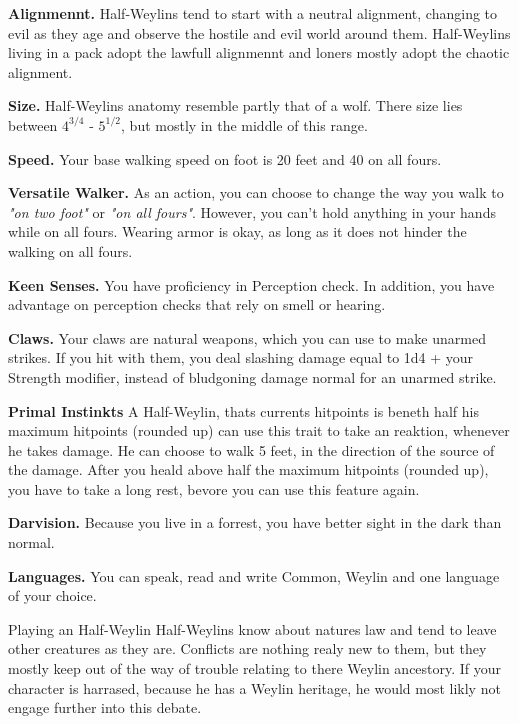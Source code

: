 \textbf{Alignmennt.} Half-Weylins tend to start with a neutral alignment, changing to evil as they age and observe the hostile and evil world around them. Half-Weylins living in a pack adopt the lawfull alignmennt and loners mostly adopt the chaotic alignment.

\textbf{Size.} Half-Weylins anatomy resemble partly that of a wolf. There size lies between $4^{3/4}$ - $5^{1/2}$, but mostly in the middle of this range.

\textbf{Speed.} Your base walking speed on foot is 20 feet and 40 on all fours.

\textbf{Versatile Walker.} As an action, you can choose to change the way you walk to \textit{"on two foot"} or \textit{"on all fours"}. However, you can't hold anything in your hands while on all fours. Wearing armor is okay, as long as it does not hinder the walking on all fours.

\textbf{Keen Senses.} You have proficiency in Perception check. In addition, you have advantage on perception checks that rely on smell or hearing.

\textbf{Claws.} Your claws are natural weapons, which you can use to make unarmed strikes. If you hit with them, you deal slashing damage equal to 1d4 + your Strength modifier, instead of bludgoning damage normal for an unarmed strike.

\textbf{Primal Instinkts} A Half-Weylin, thats currents hitpoints is beneth half his maximum hitpoints (rounded up) can use this trait to take an reaktion, whenever he takes damage. He can choose to walk 5 feet, in the direction of the source of the damage. After you heald above half the maximum hitpoints (rounded up), you have to take a long rest, bevore you can use this feature again.

\textbf{Darvision.} Because you live in a forrest, you have better sight in the dark than normal. 

\textbf{Languages.} You can speak, read and write Common, Weylin and one language of your choice.

\begin{commentbox}{Playing an Half-Weylin}
Half-Weylins know about natures law and tend to leave other creatures as they are. Conflicts are nothing realy new to them, but they mostly keep out of the way of trouble relating to there Weylin ancestory. If your character is harrased, because he has a Weylin heritage, he would most likly not engage further into this debate.
\end{commentbox}



